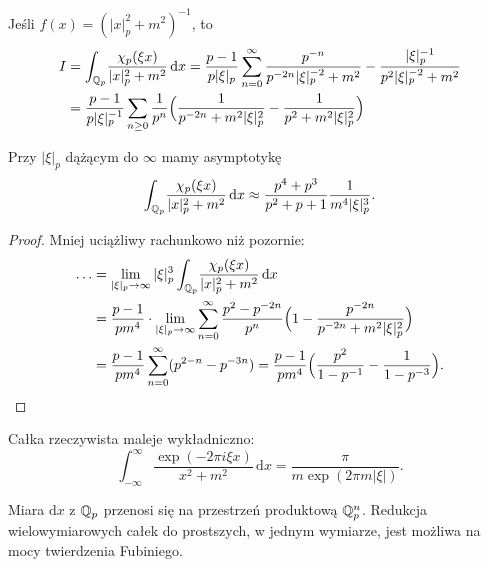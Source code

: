 \begin{przyklad}
	Jeśli $f(x) = (|x|_p^2 + m^2)^{-1}$, to
	\begin{align*}
		I & = \int_{\mathbb Q_p} \!\frac{\chi_p(\xi x)}{|x|_p^2 + m^2} \,\textrm{d}x = \frac{p - 1}{p|\xi|_p} \sum_{n = 0}^\infty \frac{p^{-n}}{p^{-2n}|\xi|_p^{-2} + m^2} - \frac{|\xi|_p^{-1}}{p^2|\xi|_p^{-2} + m^2} \\
		& = \frac{p - 1}{p|\xi|_p^{-1}} \sum_{n \ge 0} \frac{1}{p^n} \Bigl(\frac{1}{p^{-2n}+m^2|\xi|_p^2}-\frac{1}{p^2+m^2|\xi|_p^2} \Bigr)
	\end{align*}
\end{przyklad}

\begin{wniosek}
	Przy $|\xi|_p$ dążącym do $\infty$ mamy asymptotykę \[\int_{\mathbb Q_p} \!\frac{\chi_p(\xi x)}{|x|_p^2 + m^2} \,\textrm{d}x \approx \frac{p^4 + p^3}{p^2 + p + 1} \frac{1}{m^4 |\xi|_p^3}.\]
\end{wniosek}

\begin{proof}
	Mniej uciążliwy rachunkowo niż pozornie:
	\begin{align*}
		\ldots & = \lim_{|\xi|_p \to \infty} |\xi|_p^3 \int_{\mathbb Q_p} \!\frac{\chi_p(\xi x)}{|x|_p^2 + m^2} \,\textrm{d}x \\
		& = \frac{p-1}{pm^4} \cdot \lim_{|\xi|_p \to \infty} \sum_{n=0}^\infty \frac{p^2-p^{-2n}}{p^n} \Bigl(1-\frac{p^{-2n}}{p^{-2n} + m^2 |\xi|_p^2}\Bigr)\\
		& = \frac{p-1}{pm^4} \sum_{n=0}^\infty (p^{2-n} - p^{-3n}) = \frac{p-1}{pm^4} \Bigl( \frac{p^2}{1-p^{-1}} - \frac{1}{1-p^{-3}} \Bigr). \qedhere
	\end{align*}
\end{proof}

\begin{fakt}
	Całka rzeczywista maleje wykładniczno: \[\int_{-\infty}^\infty \frac{\exp(-2 \pi i \xi x)}{x^2 + m^2} \,\textrm{d}x = \frac{\pi}{m \exp(2 \pi m |\xi|)}.\]
\end{fakt}


Miara  $\textrm{d}x$ z $\mathbb Q_p$ przenosi się na przestrzeń produktową $\mathbb Q_p^n$.
Redukcja wielowymiarowych całek do prostszych, w jednym wymiarze, jest możliwa na mocy twierdzenia Fubiniego.

